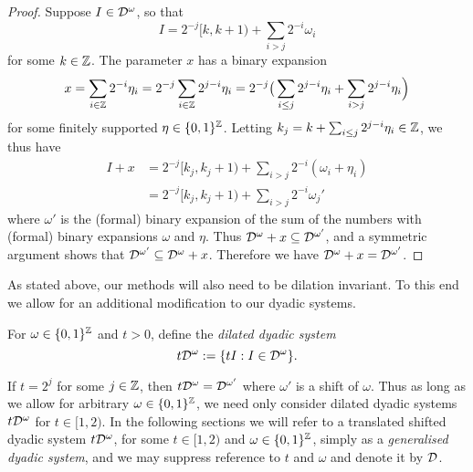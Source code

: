 \begin{proof}
  Suppose $I \in \mathcal{D}^{\omega}$, so that
  \begin{equation*}
    I = 2^{-j}[k, k+1) + \sum_{i > j} 2^{-i} \omega_{i}
  \end{equation*}
  for some $k \in \mathbb{Z}$.
  The parameter $x$ has a binary expansion
  \begin{equation*}
    x = \sum_{i \in \mathbb{Z}} 2^{-i} \eta_{i}
    = 2^{-j} \sum_{i \in \mathbb{Z}} 2^{j-i}\eta_{i}
    = 2^{-j} \big( \sum_{i \leq j} 2^{j-i}\eta_{i} + \sum_{i > j} 2^{j-i}\eta_{i} \Big) 
  \end{equation*}
  for some finitely supported $\eta \in \{0,1\}^{\mathbb{Z}}$.
  Letting $k_{j} = k + \sum_{i \leq j} 2^{j-i} \eta_{i} \in \mathbb{Z}$, we thus have
  \begin{equation*}
    \begin{aligned}
      I + x &= 2^{-j}[k_{j}, k_{j} + 1) + \sum_{i > j} 2^{-i} (\omega_{i} + \eta_{i}) \\
      &= 2^{-j}[k_{j}, k_{j} + 1) + \sum_{i > j} 2^{-i} \omega_{j}'
    \end{aligned}
  \end{equation*}
  where $\omega'$ is the (formal) binary expansion of the sum of the numbers with (formal) binary expansions $\omega$ and $\eta$.
  Thus $\mathcal{D}^{\omega} + x \subseteq \mathcal{D}^{\omega'}$, and a symmetric argument shows that $\mathcal{D}^{\omega'} \subseteq \mathcal{D}^{\omega} + x$.
  Therefore we have $\mathcal{D}^{\omega} + x = \mathcal{D}^{\omega'}$.
\end{proof}

As stated above, our methods will also need to be dilation invariant.
To this end we allow for an additional modification to our dyadic systems.

\begin{defn}
  For $\omega \in \{0,1\}^{\mathbb{Z}}$ and $t > 0$, define the \emph{dilated dyadic system}
  \begin{equation*}
    t\mathcal{D}^{\omega} := \{tI : I \in \mathcal{D}^{\omega}\}.
  \end{equation*}
\end{defn}

If $t = 2^{j}$ for some $j \in \mathbb{Z}$, then $t\mathcal{D}^{\omega} = \mathcal{D}^{\omega'}$ where $\omega'$ is a shift of $\omega$.
Thus as long as we allow for arbitrary $\omega \in \{0,1\}^{\mathbb{Z}}$, we need only consider dilated dyadic systems $t\mathcal{D}^{\omega}$ for $t \in [1,2)$.
In the following sections we will refer to a translated shifted dyadic system $t\mathcal{D}^{\omega}$, for some $t \in [1,2)$ and $\omega \in \{0,1\}^{\mathbb{Z}}$, simply as a \emph{generalised dyadic system}, and we may suppress reference to $t$ and $\omega$ and denote it by $\mathcal{D}$.

